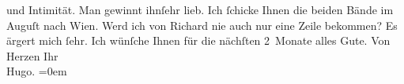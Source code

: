 \begin{ledgroupsized}[t]{13cm}
                    und Intimität. Man gewinnt ihnſehr lieb. Ich ſchicke Ihnen die
                    beiden Bände im Auguſt nach Wien.\pend
           \pstart
           {\pb}Werd ich von Richard nie auch nur eine Zeile
                    bekommen?\pend
           \pstart
           Es ärgert mich ſehr.\pend
           \pstart
           Ich wünſche Ihnen für die nächſten 2 Monate alles Gute.\pend
           \pstart
           Von Herzen Ihr{\\[\baselineskip]}\spacefill\mbox{Hugo.}\pend
           \leftskip=0em{}
         
         \endnumbering{}\end{ledgroupsized}  \newcommand{\dateiname}{L00706}\newcommand{\titel}{Hugo von Hofmannsthal an Arthur Schnitzler, [19. 7. 1897]}\newcommand{\editorInnen}{Martin Anton Müller und Gerd-Hermann Susen}
      